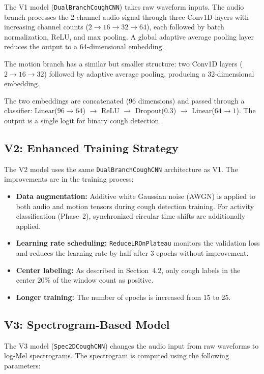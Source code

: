 The V1 model (\texttt{DualBranchCoughCNN}) takes raw waveform inputs. The audio branch processes the 2-channel audio signal through three Conv1D layers with increasing channel counts ($2 \to 16 \to 32 \to 64$), each followed by batch normalization, ReLU, and max pooling. A global adaptive average pooling layer reduces the output to a 64-dimensional embedding.

The motion branch has a similar but smaller structure: two Conv1D layers ($2 \to 16 \to 32$) followed by adaptive average pooling, producing a 32-dimensional embedding.

The two embeddings are concatenated (96 dimensions) and passed through a classifier: Linear($96 \to 64$) $\to$ ReLU $\to$ Dropout(0.3) $\to$ Linear($64 \to 1$). The output is a single logit for binary cough detection.

\subsection{V2: Enhanced Training Strategy}

The V2 model uses the same \texttt{DualBranchCoughCNN} architecture as V1. The improvements are in the training process:

\begin{itemize}[nosep]
    \item \textbf{Data augmentation:} Additive white Gaussian noise (AWGN) is applied to both audio and motion tensors during cough detection training. For activity classification (Phase~2), synchronized circular time shifts are additionally applied.
    \item \textbf{Learning rate scheduling:} \texttt{ReduceLROnPlateau} monitors the validation loss and reduces the learning rate by half after 3 epochs without improvement.
    \item \textbf{Center labeling:} As described in Section~4.2, only cough labels in the center 20\% of the window count as positive.
    \item \textbf{Longer training:} The number of epochs is increased from 15 to 25.
\end{itemize}

\subsection{V3: Spectrogram-Based Model}

The V3 model (\texttt{Spec2DCoughCNN}) changes the audio input from raw waveforms to log-Mel spectrograms. The spectrogram is computed using the following parameters:

